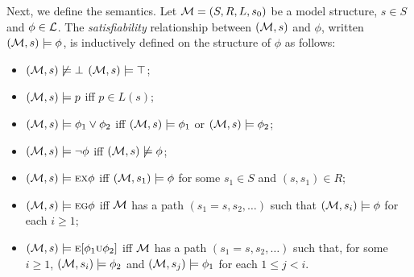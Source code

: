 \documentclass{article}
\begin{document}
Next, we define the semantics.
Let ${\cal M}=(S,R,L,s_0)$ be a model structure, $s\in S$ and $\phi \in \cal L$.
The {\em satisfiability} relationship between $({\cal M},s)$ and $\phi$,
written $({\cal M},s)\models\phi$, is inductively defined on the structure of $\phi$ as follows:

\begin{itemize}
  \item $({\cal M},s)\not\models\bot$   $({\cal M},s)\models\top$;
  \item $({\cal M},s)\models p$ iff $p\in L(s)$;
  \item $({\cal M},s)\models \phi_1\lor\phi_2$ iff
    $({\cal M},s)\models \phi_1$ or $({\cal M},s)\models \phi_2$;
  \item $({\cal M},s)\models \neg\phi$ iff  $({\cal M},s)\not\models\phi$;
  \item $({\cal M},s)\models \textsc{e}\textsc{x}\phi$ iff
    $({\cal M},s_1)\models\phi$ for some $s_1\in S$ and $(s,s_1)\in R$;
  \item $({\cal M},s)\models \textsc{e}\textsc{g}\phi$ iff
    $\cal M$ has a path $(s_1=s,s_2,\ldots)$ such that
    $({\cal M},s_i)\models\phi$ for each $i\ge 1$;
  \item $({\cal M},s)\models \textsc{e}[\phi_1\textsc{u}\phi_2]$ iff
    $\cal M$ has a path $(s_1=s,s_2,\ldots)$ such that, for some $i\ge 1$,
    $({\cal M},s_i)\models\phi_2$ and
    $({\cal M},s_j)\models\phi_1$ for each $1\leq j<i$.
\end{itemize}
\end{document}

